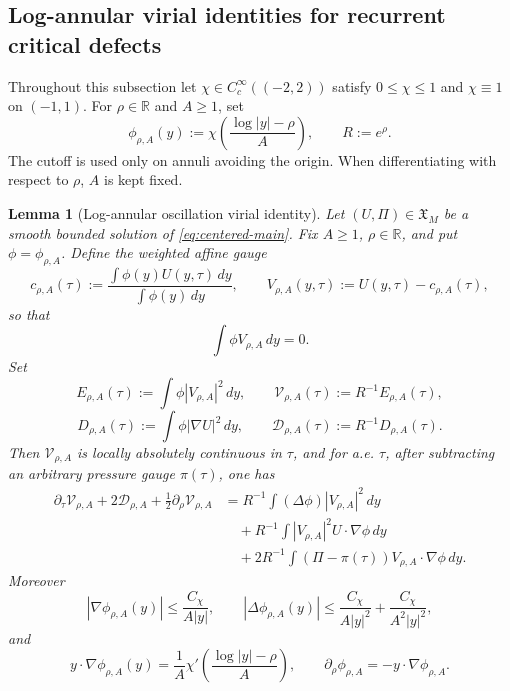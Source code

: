 \documentclass[11pt]{amsart}
\numberwithin{equation}{section}
\theoremstyle{plain}
\newtheorem{lemma}[theorem]{Lemma}
\theoremstyle{definition}
\theoremstyle{remark}
\begin{document}
\subsection{Log-annular virial identities for recurrent critical defects}
\label{subsec:log-annular-virial-critical-defects}

Throughout this subsection let
\(\chi\in C_c^\infty((-2,2))\) satisfy \(0\le\chi\le1\) and
\(\chi\equiv1\) on \((-1,1)\).  For \(\rho\in\mathbb R\) and \(A\ge1\), set
\[
   \phi_{\rho,A}(y)
   :=
   \chi\!\left(\frac{\log |y|-\rho}{A}\right),
   \qquad R:=e^\rho .
\]
The cutoff is used only on annuli avoiding the origin.  When differentiating
with respect to \(\rho\), \(A\) is kept fixed.

\begin{lemma}[Log-annular oscillation virial identity]
\label{lem:log-annular-oscillation-virial}
Let \((U,\Pi)\in\mathfrak X_M\) be a smooth bounded solution of
\eqref{eq:centered-main}.  Fix \(A\ge1\), \(\rho\in\mathbb R\), and put
\(\phi=\phi_{\rho,A}\).  Define the weighted affine gauge
\[
   c_{\rho,A}(\tau)
   :=
   \frac{\int \phi(y)U(y,\tau)\,dy}{\int \phi(y)\,dy},
   \qquad
   V_{\rho,A}(y,\tau):=U(y,\tau)-c_{\rho,A}(\tau),
\]
so that
\[
   \int \phi V_{\rho,A}\,dy=0 .
\]
Set
\[
   E_{\rho,A}(\tau):=\int \phi |V_{\rho,A}|^2\,dy,
   \qquad
   \mathcal V_{\rho,A}(\tau):=R^{-1}E_{\rho,A}(\tau),
\]
\[
   D_{\rho,A}(\tau):=\int \phi |\nabla U|^2\,dy,
   \qquad
   \mathcal D_{\rho,A}(\tau):=R^{-1}D_{\rho,A}(\tau).
\]
Then \(\mathcal V_{\rho,A}\) is locally absolutely continuous in \(\tau\), and
for a.e. \(\tau\), after subtracting an arbitrary pressure gauge \(\pi(\tau)\),
one has
\begin{equation}
\label{eq:log-annular-virial-identity}
\begin{aligned}
   \partial_\tau \mathcal V_{\rho,A}
   +2\mathcal D_{\rho,A}
   +\frac12\partial_\rho \mathcal V_{\rho,A}
   &=
   R^{-1}\int (\Delta\phi)|V_{\rho,A}|^2\,dy                         \\
   &\quad
   +R^{-1}\int |V_{\rho,A}|^2U\cdot\nabla\phi\,dy                    \\
   &\quad
   +2R^{-1}\int (\Pi-\pi(\tau))V_{\rho,A}\cdot\nabla\phi\,dy .
\end{aligned}
\end{equation}
Moreover
\begin{equation}
\label{eq:log-cutoff-derivative-bounds}
   |\nabla\phi_{\rho,A}(y)|\le \frac{C_\chi}{A|y|},
   \qquad
   |\Delta\phi_{\rho,A}(y)|\le
   \frac{C_\chi}{A|y|^2}+\frac{C_\chi}{A^2|y|^2},
\end{equation}
and
\[
   y\cdot\nabla\phi_{\rho,A}(y)
   =
   \frac1A\chi'\!\left(\frac{\log |y|-\rho}{A}\right),
   \qquad
   \partial_\rho\phi_{\rho,A}=-y\cdot\nabla\phi_{\rho,A}.
\]
\end{lemma}
\end{document}
